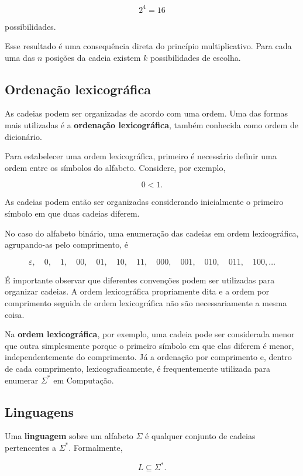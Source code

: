 \documentclass[
  brazilian,
  letterpaper,
]{book}
\theoremstyle{plain}
\theoremstyle{definition}
\theoremstyle{remark}
\begin{document}
\[
2^4=16
\]

possibilidades.

Esse resultado é uma consequência direta do princípio multiplicativo.
Para cada uma das \(n\) posições da cadeia existem \(k\) possibilidades
de escolha.

\subsection{Ordenação
lexicográfica}\label{ordenauxe7uxe3o-lexicogruxe1fica}

As cadeias podem ser organizadas de acordo com uma ordem. Uma das formas
mais utilizadas é a \textbf{ordenação lexicográfica}, também conhecida
como ordem de dicionário.

Para estabelecer uma ordem lexicográfica, primeiro é necessário definir
uma ordem entre os símbolos do alfabeto. Considere, por exemplo,

\[
0<1.
\]

As cadeias podem então ser organizadas considerando inicialmente o
primeiro símbolo em que duas cadeias diferem.

No caso do alfabeto binário, uma enumeração das cadeias em ordem
lexicográfica, agrupando-as pelo comprimento, é

\[
\varepsilon,\quad
0,\quad
1,\quad
00,\quad
01,\quad
10,\quad
11,\quad
000,\quad
001,\quad
010,\quad
011,\quad
100,\ldots
\]

É importante observar que diferentes convenções podem ser utilizadas
para organizar cadeias. A ordem lexicográfica propriamente dita e a
ordem por comprimento seguida de ordem lexicográfica não são
necessariamente a mesma coisa.

Na \textbf{ordem lexicográfica}, por exemplo, uma cadeia pode ser
considerada menor que outra simplesmente porque o primeiro símbolo em
que elas diferem é menor, independentemente do comprimento. Já a
ordenação por comprimento e, dentro de cada comprimento,
lexicograficamente, é frequentemente utilizada para enumerar
\(\Sigma^*\) em Computação.

\subsection{Linguagens}\label{linguagens}

Uma \textbf{linguagem} sobre um alfabeto \(\Sigma\) é qualquer conjunto
de cadeias pertencentes a \(\Sigma^*\). Formalmente,

\[
L\subseteq\Sigma^*.
\]
\end{document}
